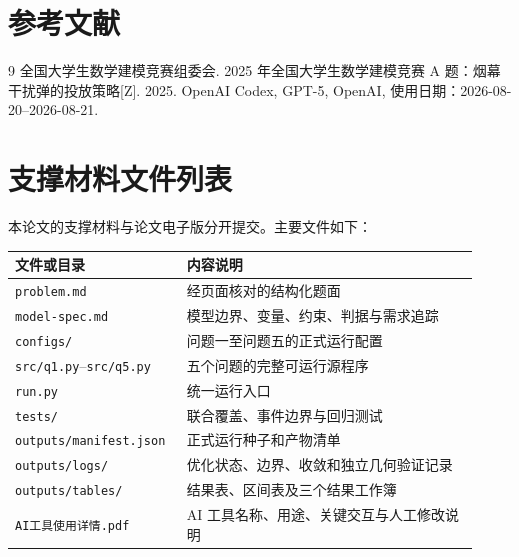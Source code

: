 \documentclass[UTF8,zihao=-4]{ctexart}
\begin{document}
\setcounter{page}{1}



\vfill
{}

\clearpage


\section*{参考文献}
\begin{thebibliography}{9}
   全国大学生数学建模竞赛组委会. 2025 年全国大学生数学建模竞赛 A 题：烟幕干扰弹的投放策略[Z]. 2025.
   OpenAI Codex, GPT-5, OpenAI, 使用日期：2026-08-20--2026-08-21.
\end{thebibliography}

\appendix
\section{支撑材料文件列表}

本论文的支撑材料与论文电子版分开提交。主要文件如下：
\begin{longtable}{p{0.32\linewidth}p{0.60\linewidth}}
\toprule
文件或目录 & 内容说明 \\
\midrule
\texttt{problem.md} & 经页面核对的结构化题面 \\
\texttt{model-spec.md} & 模型边界、变量、约束、判据与需求追踪 \\
\texttt{configs/} & 问题一至问题五的正式运行配置 \\
\texttt{src/q1.py}--\texttt{src/q5.py} & 五个问题的完整可运行源程序 \\
\texttt{run.py} & 统一运行入口 \\
\texttt{tests/} & 联合覆盖、事件边界与回归测试 \\
\texttt{outputs/manifest.json} & 正式运行种子和产物清单 \\
\texttt{outputs/logs/} & 优化状态、边界、收敛和独立几何验证记录 \\
\texttt{outputs/tables/} & 结果表、区间表及三个结果工作簿 \\
\texttt{AI工具使用详情.pdf} & AI 工具名称、用途、关键交互与人工修改说明 \\
\bottomrule
\end{longtable}
\end{document}
